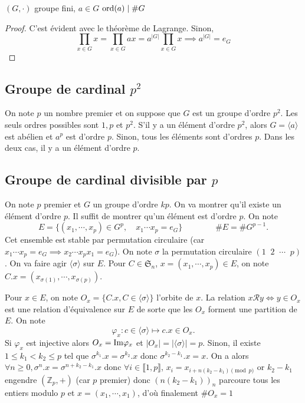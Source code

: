 \begin{prop}
    \Hyp $(G, \cdot)$ groupe fini, $a\in G$
    \Conc $\mathrm{ord}(a)\;|\;\# G$
\end{prop}

\begin{proof}
    C'est évident avec le théorème de Lagrange. Sinon, \[
        \prod_{x\in G}x=\prod_{x\in G}ax=a^{|G|}\prod_{x\in G}x \implies a^{|G|}=e_G
    \]
\end{proof}

\subsection{Groupe de cardinal $p^2$}

On note $p$ un nombre premier et on suppose que $G$ est un groupe d'ordre $p^2$. Les seuls ordres possibles sont $1, p$ et $p^2$. S'il y a un élément d'ordre $p^2$, alors $G=\langle a\rangle$ est abélien et $a^p$ est d'ordre $p$. Sinon, tous les éléments sont d'ordres $p$. Dans les deux cas, il y a un élément d'ordre $p$.

\subsection{Groupe de cardinal divisible par $p$}

On note $p$ premier et $G$ un groupe d'ordre $kp$. On va montrer qu'il existe un élément d'ordre $p$. Il suffit de montrer qu'un élément est d'ordre $p$. On note \[
    E=\{(x_1, \cdots, x_p)\in G^p, \quad x_1 \cdots x_p=e_G\}\qquad \qquad \#E=\#G^{p-1}.
\]
Cet ensemble est stable par permutation circulaire (car $x_1\cdots x_p=e_G \implies x_2\cdots x_px_1=e_G$). On note $\sigma$ la permutation circulaire $(1\;\; 2 \;\; \cdots \;\; p)$. On va faire agir $\langle \sigma \rangle$ sur $E$. Pour $C\in \mathfrak S_n$, $x=(x_1, \cdots, x_p)\in E$, on note $C.x=(x_{\sigma(1)}, \cdots, x_{\sigma(p)})$.

Pour $x\in E$, on note $O_x=\{C.x, C\in\langle \sigma\rangle\}$ l'orbite de $x$. La relation $x\mathcal Ry\iff y\in O_x$ est une relation d'équivalence sur $E$ de sorte que les $O_x$ forment une partition de $E$. On note \[
    \varphi_x:c\in \langle \sigma \rangle \longmapsto c.x\in O_x.
\]
Si $\varphi_x$ est injective alors $O_x=\mathrm{Im} \varphi_x$ et $|O_x|=|\langle \sigma \rangle|=p$. Sinon, il existe $1\leq k_1 < k_2\leq p$ tel que $\sigma^{k_1}.x=\sigma^{k_2}.x$ donc $\sigma^{k_2-k_1}.x=x$. On a alors $\forall n\geq 0, \sigma^n.x=\sigma^{n+k_2-k_1}.x$ donc $\forall i\in\llbracket 1, p\rrbracket$, $x_i=x_{i+n(k_2-k_1)\pmod p}$ or $k_2-k_1$ engendre $(\mathbb Z_p, +)$ (car $p$ premier) donc $(n(k_2-k_1))_n$ parcoure tous les entiers modulo $p$ et $x=(x_1, \cdots, x_1)$, d'où finalement $\#O_x=1$

